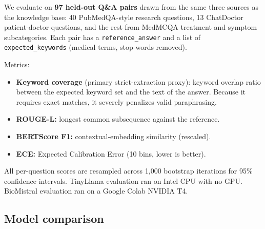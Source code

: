 \documentclass[conference,a4paper]{IEEEtran}
\begin{document}
We evaluate on \textbf{97 held-out Q\&A pairs} drawn from the same three
sources as the knowledge base: 40 PubMedQA-style research questions,
13 ChatDoctor patient-doctor questions, and the rest from MedMCQA
treatment and symptom subcategories.
Each pair has a \texttt{reference\_answer} and a list of
\texttt{expected\_keywords} (medical terms, stop-words removed).

Metrics:
\begin{itemize}[noitemsep,topsep=2pt]
  \item \textbf{Keyword coverage} (primary strict-extraction proxy):
        keyword overlap ratio between the expected keyword set and the
        text of the answer. Because it requires exact matches, it severely 
        penalizes valid paraphrasing.
  \item \textbf{ROUGE-L:} longest common subsequence against the reference.
  \item \textbf{BERTScore F1:} contextual-embedding similarity (rescaled).
  \item \textbf{ECE:} Expected Calibration Error \cite{guo2017calibration}
        (10 bins, lower is better).
\end{itemize}

All per-question scores are resampled across 1,000 bootstrap iterations
for 95\% confidence intervals.
TinyLlama evaluation ran on Intel CPU with no GPU.
BioMistral evaluation ran on a Google Colab NVIDIA T4.

\subsection{Model comparison}

\begin{table}[h]
\centering
\caption{Model comparison (n=97, KB v2, 95\% CI in brackets). TinyLlama
         inference on CPU; BioMistral on NVIDIA T4 (Colab).}
\label{tab:models}
\renewcommand{\arraystretch}{1.2}
\end{table}
\end{document}
